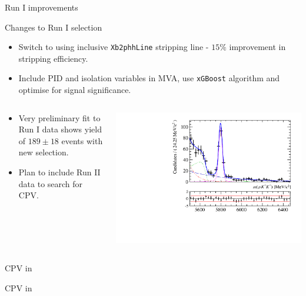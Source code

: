 \documentclass{beamer}
\begin{document}
\begin{frame}{ Run I improvements}
  \small
  \begin{block}{Changes to Run I selection}
    \begin{itemize}
    \item Switch to using inclusive \texttt{Xb2phhLine} stripping line - $15\%$ improvement in stripping efficiency.
    \item Include PID and isolation variables in MVA, use \texttt{xGBoost} algorithm and optimise for signal significance.
    \end{itemize}
  \end{block}
  \begin{columns}
    \begin{column}{.5\textwidth}
      \begin{itemize}
      \item Very preliminary fit to Run I data shows yield of $189\pm18$ events with new selection.
      \item Plan to include Run II data to search for CPV.
      \end{itemize}
    \end{column}
    \begin{column}{.5\textwidth}
      \includegraphics[width=\textwidth]{Xib2KKp_data.pdf}
    \end{column}
  \end{columns}
\end{frame}

\begin{frame}{CPV in }
  \begin{block}{}
    \begin{center}
      \Huge CPV in 
    \end{center}
  \end{block}
\end{frame}
\end{document}
